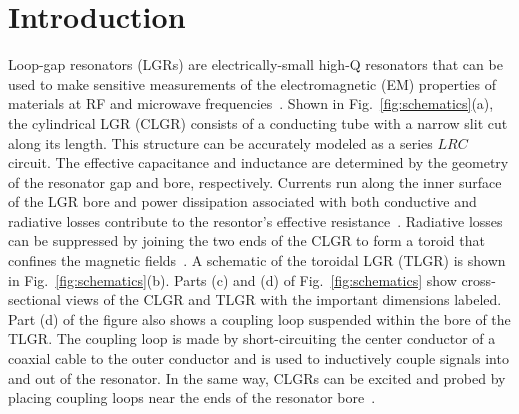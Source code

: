 \documentclass[conference]{IEEEtran}
\begin{document}
\section{Introduction}
Loop-gap resonators (LGRs) are electrically-small  high-Q resonators that can be used to make sensitive measurements of the electromagnetic (EM) properties of materials at RF and microwave frequencies~\cite{Hardy:1981, Froncisz:1982}.  Shown in Fig.~\ref{fig:schematics}(a), the cylindrical LGR (CLGR) consists of a conducting tube with a narrow slit cut along its length.  This structure can be accurately modeled as a series $LRC$ circuit.  The effective capacitance and inductance are determined by the geometry of the resonator gap and bore, respectively.  Currents run along the inner surface of the LGR bore and power dissipation associated with both conductive and radiative losses contribute to the resontor's effective resistance~\cite{Hardy:1981, Bobowski:2013}.  Radiative losses can be suppressed by joining the two ends of the CLGR to form a toroid that confines the magnetic fields~\cite{Bobowski:2016}.  A schematic of the toroidal LGR (TLGR) is shown in Fig.~\ref{fig:schematics}(b).  Parts (c) and (d) of Fig.~\ref{fig:schematics} show cross-sectional views of the CLGR and TLGR with the important dimensions labeled.  Part (d) of the figure also shows a coupling loop suspended within the bore of the TLGR.  The coupling loop is made by short-circuiting the center conductor of a coaxial cable to the outer conductor and is used to inductively couple signals into and out of the resonator.  In the same way, CLGRs can be excited and probed by placing coupling loops near the ends of the resonator bore~\cite{Rinard:1993}.       
\end{document}
